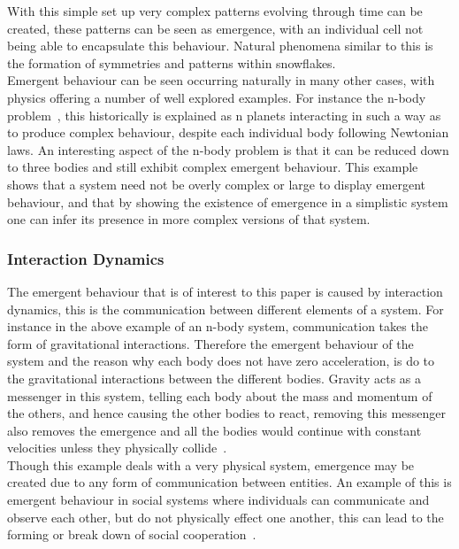 \documentclass{article}
\begin{document}
With this simple set up very complex patterns evolving through time can be created, these patterns can be seen as emergence, with an individual cell not being able to encapsulate this behaviour. Natural phenomena similar to this is the formation of symmetries and patterns within snowflakes.\\
Emergent behaviour can be seen occurring naturally in many other cases, with physics offering a number of well explored examples. For instance the n-body problem~\cite{nbodyproblem}, this historically is explained as n planets interacting in such a way as to produce complex behaviour, despite each individual body following Newtonian laws. An interesting aspect of the n-body problem is that it can be reduced down to three bodies and still exhibit complex emergent behaviour. This example shows that a system need not be overly complex or large to display emergent behaviour, and that by showing the existence of emergence in a simplistic system one can infer its presence in more complex versions of that system.   


\subsubsection{Interaction Dynamics}
The emergent behaviour that is of interest to this paper is caused by interaction dynamics, this is the communication between different elements of a system. For instance in the above example of an n-body system, communication takes the form of gravitational interactions. Therefore the emergent behaviour of the system and the reason why each body does not have zero acceleration, is do to the gravitational interactions between the different bodies.  Gravity acts as a messenger in this system, telling each body about the mass and momentum of the others, and hence causing the other bodies to react, removing this messenger also removes the emergence and all the bodies would continue with constant velocities unless they physically collide~\cite{newtonconstantvelocity}.\\
Though this example deals with a very physical system, emergence may be created due to any form of communication between entities. An example of this is emergent behaviour in social systems where individuals can communicate and observe each other, but do not physically effect one another, this can lead to the forming or break down of social cooperation~\cite{socialemrgence}.
\end{document}

